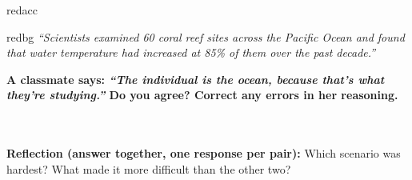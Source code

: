 \documentclass[10pt]{article}
\begin{document}
\vspace{0.16in}

\begin{scenariobox}{redacc}

\begin{headlinebox}{redbg}
\small\textit{``Scientists examined 60 coral reef sites across the Pacific Ocean
and found that water temperature had increased at 85\% of them over the past decade.''}
\end{headlinebox}

\vspace{8pt}
\componenttable

\vspace{8pt}
\small\textbf{A classmate says: \textit{``The individual is the ocean, because
that's what they're studying.''} Do you agree? Correct any errors in her reasoning.}\\[4pt]
\writeline\\[1pt]\writeline\\[1pt]\writeline

\end{scenariobox}

\vspace{0.16in}

\begin{tcolorbox}[colback=goldbg, colframe=goldacc, boxrule=0.8pt, arc=2mm,
    left=3mm, right=3mm, top=2mm, bottom=2mm]
\small\textbf{Reflection \textnormal{\color{slate}(answer together, one response per pair):}}
\quad Which scenario was hardest?
What made it more difficult than the other two?\\[6pt]
\writeline\\[1pt]\writeline
\end{tcolorbox}
\end{document}
